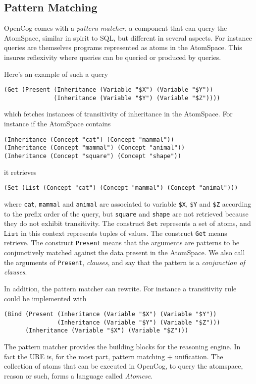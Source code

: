 \documentclass[runningheads]{llncs}
\begin{document}
\subsection{Pattern Matching}
\label{PM}

OpenCog comes with a \emph{pattern matcher}, a component that can
query the AtomSpace, similar in spirit to SQL, but different in
several aspects. For instance queries are themselves programs
represented as atoms in the AtomSpace. This insures reflexivity where
queries can be queried or produced by queries. 

Here's an example of such a query
\begin{verbatim}
(Get (Present (Inheritance (Variable "$X") (Variable "$Y"))
              (Inheritance (Variable "$Y") (Variable "$Z"))))
\end{verbatim}
which fetches instances of transitivity of inheritance in the
AtomSpace. For instance if the AtomSpace contains
\begin{verbatim}
(Inheritance (Concept "cat") (Concept "mammal"))
(Inheritance (Concept "mammal") (Concept "animal"))
(Inheritance (Concept "square") (Concept "shape"))
\end{verbatim}
it retrieves
\begin{verbatim}
(Set (List (Concept "cat") (Concept "mammal") (Concept "animal")))
\end{verbatim}
where \texttt{cat}, \texttt{mammal} and \texttt{animal} are associated
to variable \texttt{\$X}, \texttt{\$Y} and \texttt{\$Z} according to
the prefix order of the query, but \texttt{square} and \texttt{shape}
are not retrieved because they do not exhibit transitivity. The
construct $\texttt{Set}$ represents a set of atoms, and
$\texttt{List}$ in this context represents tuples of values. The
construct \texttt{Get} means retrieve. The construct \texttt{Present}
means that the arguments are patterns to be conjunctively matched
against the data present in the AtomSpace. We also call the arguments
of \texttt{Present}, \emph{clauses}, and say that the pattern is a
\emph{conjunction of clauses}.

In addition, the pattern matcher can rewrite. For instance a
transitivity rule could be implemented with
\begin{verbatim}
(Bind (Present (Inheritance (Variable "$X") (Variable "$Y"))
               (Inheritance (Variable "$Y") (Variable "$Z")))
      (Inheritance (Variable "$X") (Variable "$Z")))
\end{verbatim}
The pattern matcher provides the building blocks for the reasoning
engine. In fact the URE is, for the most part, pattern matching +
unification. The collection of atoms that can be executed in OpenCog,
to query the atomspace, reason or such, forms a language called
\emph{Atomese}.
\end{document}
